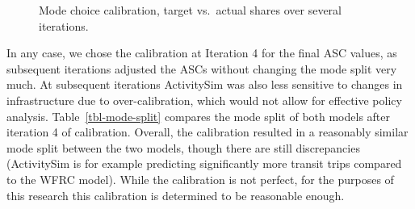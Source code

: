 \documentclass[fancy, twoside, mastersfancy, ms]{byuthesis}
\begin{document}
\begin{figure}


\caption{\label{fig-mcc-adjustments}Mode choice calibration, target
vs.~actual shares over several iterations.}

\end{figure}%

In any case, we chose the calibration at Iteration 4 for the final ASC
values, as subsequent iterations adjusted the ASCs without changing the
mode split very much. At subsequent iterations ActivitySim was also less
sensitive to changes in infrastructure due to over-calibration, which
would not allow for effective policy analysis.
Table~\ref{tbl-mode-split} compares the mode split of both models after
iteration 4 of calibration. Overall, the calibration resulted in a
reasonably similar mode split between the two models, though there are
still discrepancies (ActivitySim is for example predicting significantly
more transit trips compared to the WFRC model). While the calibration is
not perfect, for the purposes of this research this calibration is
determined to be reasonable enough.
\end{document}
